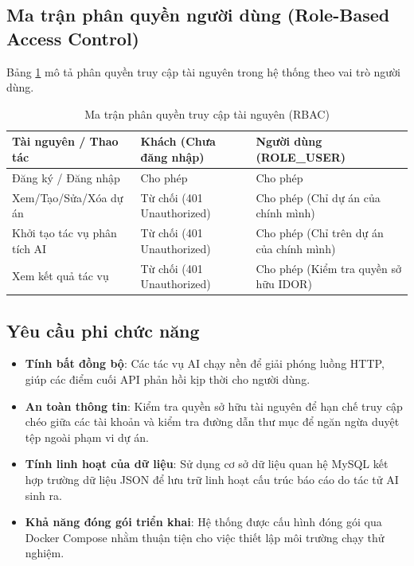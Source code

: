 \documentclass[12pt,a4paper]{report}
\begin{document}
\subsection{Ma trận phân quyền người dùng (Role-Based Access Control)}
Bảng \ref{tab:rbac_matrix} mô tả phân quyền truy cập tài nguyên trong hệ thống theo vai trò người dùng.

\begin{table}[H]
\centering
\caption{Ma trận phân quyền truy cập tài nguyên (RBAC)}
\label{tab:rbac_matrix}
\renewcommand{\arraystretch}{1.2}
\begin{tabular}{|p{4.5cm}|p{3.5cm}|p{3.5cm}|}
\hline
\textbf{Tài nguyên / Thao tác} & \textbf{Khách (Chưa đăng nhập)} & \textbf{Người dùng (ROLE\_USER)} \\ \hline
Đăng ký / Đăng nhập & Cho phép & Cho phép \\ \hline
Xem/Tạo/Sửa/Xóa dự án & Từ chối (401 Unauthorized) & Cho phép (Chỉ dự án của chính mình) \\ \hline
Khởi tạo tác vụ phân tích AI & Từ chối (401 Unauthorized) & Cho phép (Chỉ trên dự án của chính mình) \\ \hline
Xem kết quả tác vụ & Từ chối (401 Unauthorized) & Cho phép (Kiểm tra quyền sở hữu IDOR) \\ \hline
\end{tabular}
\end{table}

\subsection{Yêu cầu phi chức năng}
\begin{itemize}
    \item \textbf{Tính bất đồng bộ}: Các tác vụ AI chạy nền để giải phóng luồng HTTP, giúp các điểm cuối API phản hồi kịp thời cho người dùng.
    \item \textbf{An toàn thông tin}: Kiểm tra quyền sở hữu tài nguyên để hạn chế truy cập chéo giữa các tài khoản và kiểm tra đường dẫn thư mục để ngăn ngừa duyệt tệp ngoài phạm vi dự án.
    \item \textbf{Tính linh hoạt của dữ liệu}: Sử dụng cơ sở dữ liệu quan hệ MySQL kết hợp trường dữ liệu JSON để lưu trữ linh hoạt cấu trúc báo cáo do tác tử AI sinh ra.
    \item \textbf{Khả năng đóng gói triển khai}: Hệ thống được cấu hình đóng gói qua Docker Compose nhằm thuận tiện cho việc thiết lập môi trường chạy thử nghiệm.
\end{itemize}
\end{document}
